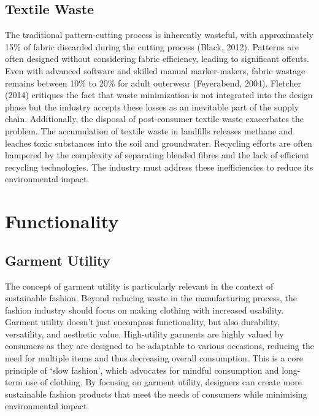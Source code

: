 \subsection{Textile Waste}
The traditional pattern-cutting process is inherently wasteful, with approximately 15\% of fabric discarded during the cutting process (Black, 2012). Patterns are often designed without considering fabric efficiency, leading to significant offcuts. Even with advanced software and skilled manual marker-makers, fabric wastage remains between 10\% to 20\% for adult outerwear (Feyerabend, 2004). Fletcher (2014) critiques the fact that waste minimization is not integrated into the design phase but the industry accepts these losses as an inevitable part of the supply chain. 
Additionally, the disposal of post-consumer textile waste exacerbates the problem. The accumulation of textile waste in landfills releases methane and leaches toxic substances into the soil and groundwater. Recycling efforts are often hampered by the complexity of separating blended fibres and the lack of efficient recycling technologies. The industry must address these inefficiencies to reduce its environmental impact.


\section{Functionality} \label{sec:sections}

\subsection{Garment Utility}
The concept of garment utility is particularly relevant in the context of sustainable fashion. Beyond reducing waste in the manufacturing process, the fashion industry should focus on making clothing with increased usability. Garment utility doesn’t just encompass functionality, but also durability, versatility, and aesthetic value. High-utility garments are highly valued by consumers as they are designed to be adaptable to various occasions, reducing the need for multiple items and thus decreasing overall consumption. This is a core principle of ‘slow fashion’, which advocates for mindful consumption and long-term use of clothing. By focusing on garment utility, designers can create more sustainable fashion products that meet the needs of consumers while minimising environmental impact.

